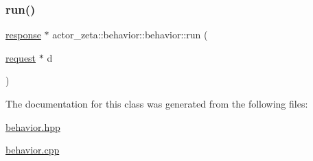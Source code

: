 \mbox{\label{classactor__zeta_1_1behavior_1_1behavior_ae1d002a9eaf9367150002d73d47d680a}} 
\subsubsection{\texorpdfstring{run()}{run()}}
{\footnotesize\ttfamily \hyperlink{classactor__zeta_1_1behavior_1_1response}{response} $\ast$ actor\+\_\+zeta\+::behavior\+::behavior\+::run (\begin{DoxyParamCaption}\item[{\hyperlink{classactor__zeta_1_1behavior_1_1request}{request} $\ast$}]{d }\end{DoxyParamCaption})}



The documentation for this class was generated from the following files\+:\begin{DoxyCompactItemize}
\item 
\hyperlink{behavior_8hpp}{behavior.\+hpp}\item 
\hyperlink{behavior_8cpp}{behavior.\+cpp}\end{DoxyCompactItemize}
